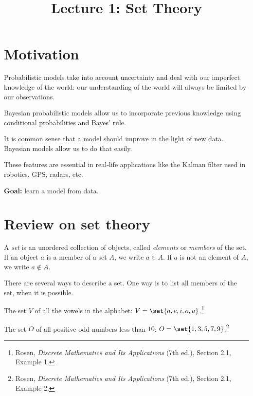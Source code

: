 
\title{Lecture 1: Set Theory}
\author{}\date{}


\maketitle

\section*{Motivation}
Probabilistic models take into account uncertainty and deal with our imperfect knowledge of the world: our understanding of the world will always be limited by our observations.

Bayesian probabilistic models allow us to incorporate previous knowledge using conditional probabilities and Bayes' rule.

It is common sense that a model should improve in the light of new data. Bayesian models allow us to do that easily.

These features are essential in real-life applications like the Kalman filter used in robotics, GPS, radars, etc.

\textbf{Goal:} learn a model from data.

\section{Review on set theory}

\begin{definition}[Set]
A \emph{set} is an unordered collection of objects, called \emph{elements} or \emph{members} of the set.
If an object $a$ is a member of a set $A$, we write $a \in A$. If $a$ is not an element of $A$, we write $a \notin A$.
\end{definition}

There are several ways to describe a set. One way is to list all members of the set, when it is possible.

\begin{example}
The set $V$ of all the vowels in the alphabet: $V = \set{a, e, i, o, u}$.\footnote{Rosen, \emph{Discrete Mathematics and Its Applications} (7th ed.), Section 2.1, Example 1.}
\end{example}

\begin{example}
The set $O$ of all positive odd numbers less than $10$: $O = \set{1, 3, 5, 7, 9}$.\footnote{Rosen, \emph{Discrete Mathematics and Its Applications} (7th ed.), Section 2.1, Example 2.}
\end{example}


